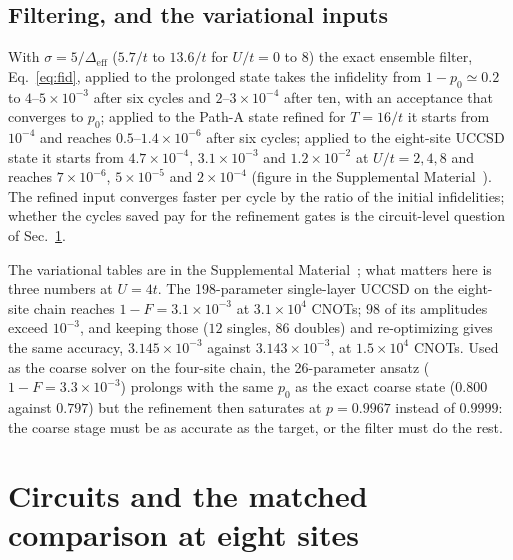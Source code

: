 \documentclass[a4paper,11pt,noarxiv]{quantumarticle}
\newcommand{\Deff}{\Delta_{\mathrm{eff}}}
\newcommand{\SM}{Supplemental Material~\cite{SM}}
\begin{document}
\subsection{Filtering, and the variational inputs}
\label{sec:res-rodeo}
With $\sigma=5/\Deff$ ($5.7/t$ to $13.6/t$ for $U/t=0$ to $8$) the exact
ensemble filter, Eq.~\eqref{eq:fid}, applied to the prolonged state takes
the infidelity from $1-p_0\simeq0.2$ to $4$--$5\times10^{-3}$ after six
cycles and $2$--$3\times10^{-4}$ after ten, with an acceptance that
converges to $p_0$; applied to the Path-A state refined for $T=16/t$ it
starts from $10^{-4}$ and reaches $0.5$--$1.4\times10^{-6}$ after six
cycles; applied to the eight-site UCCSD state it starts from
$4.7\times10^{-4}$, $3.1\times10^{-3}$ and $1.2\times10^{-2}$ at $U/t=2,4,8$
and reaches $7\times10^{-6}$, $5\times10^{-5}$ and $2\times10^{-4}$
(figure in the \SM).  The refined input converges faster per cycle by the
ratio of the initial infidelities; whether the cycles saved pay for the
refinement gates is the circuit-level question of Sec.~\ref{sec:circuits}.

The variational tables are in the \SM; what matters here is three numbers at
$U=4t$.  The 198-parameter single-layer UCCSD on the eight-site chain
reaches $1-F=3.1\times10^{-3}$ at $3.1\times10^4$ CNOTs; $98$ of its
amplitudes exceed $10^{-3}$, and keeping those ($12$ singles, $86$ doubles)
and re-optimizing gives the same accuracy, $3.145\times10^{-3}$ against
$3.143\times10^{-3}$, at $1.5\times10^4$ CNOTs.  Used as the coarse solver
on the four-site chain, the 26-parameter ansatz ($1-F=3.3\times10^{-3}$)
prolongs with the same $p_0$ as the exact coarse state ($0.800$ against
$0.797$) but the refinement then saturates at $p=0.9967$ instead of
$0.9999$: the coarse stage must be as accurate as the target, or the filter
must do the rest.

\section{Circuits and the matched comparison at eight sites}
\label{sec:circuits}
\end{document}
